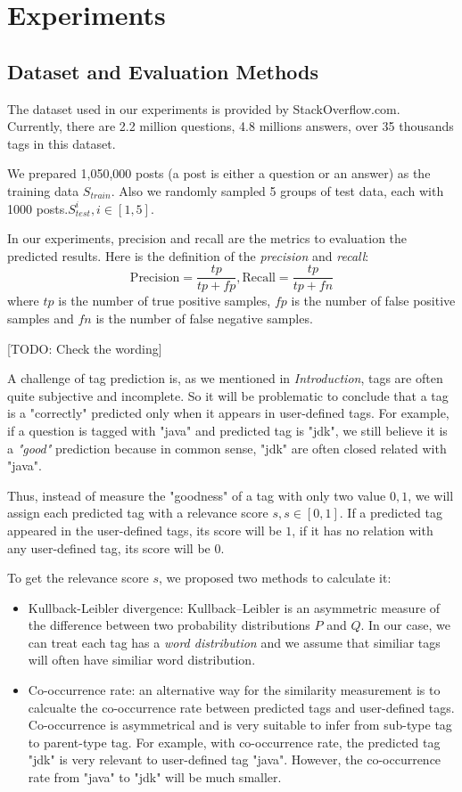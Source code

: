 \section{Experiments}

\subsection{Dataset and Evaluation Methods}
The dataset used in our experiments is provided by StackOverflow.com. Currently, there are 2.2 million questions, 4.8 millions answers, over 35 thousands tags in this dataset\cite{DataDump}.

We prepared 1,050,000 posts (a post is either a question or an answer)  as the training data $S_{train}$. Also we randomly sampled 5 groups of test data, each with 1000 posts.$S_{test}^i, i \in [1, 5]$.

In our experiments, precision and recall are the metrics to evaluation the predicted results. Here is the definition of the \emph{precision} and \emph{recall}:
$$ \text{Precision}=\frac{tp}{tp+fp}, \text{Recall}=\frac{tp}{tp+fn} $$
where $tp$ is the number of true positive samples, $fp$ is the number of false positive samples and $fn$ is the number of false negative samples.

[TODO: Check the wording]

A challenge of tag prediction is, as we mentioned in \emph{Introduction}, tags are often quite subjective and incomplete. So it will be problematic to conclude that a tag is a "correctly" predicted only when it appears in user-defined tags. For example, if a question is tagged with "java" and predicted tag is "jdk", we still believe it is a \emph{"good"} prediction because in common sense, "jdk" are often closed related with "java".

Thus, instead of measure the "goodness" of a tag with only two value ${0, 1}$, we will assign each predicted tag with a relevance score $s, s \in [0, 1]$. If a predicted tag appeared in the user-defined tags, its score will be $1$, if it has no relation with any user-defined tag, its score will be $0$.

To get the relevance score $s$, we proposed two methods to calculate it:
\begin{itemize}
    \item{Kullback-Leibler divergence}: Kullback–Leibler is an asymmetric measure of the difference between two probability distributions $P$ and $Q$. In our case, we can treat each tag has a \emph{word distribution} and we assume that similiar tags will often have similiar word distribution.
    \item{Co-occurrence rate}: an alternative way for the similarity measurement is to calcualte the co-occurrence rate between predicted tags and user-defined tags. Co-occurrence is asymmetrical and is very suitable to infer from sub-type tag to parent-type tag. For example, with co-occurrence rate, the predicted tag "jdk" is very relevant to user-defined tag "java". However, the co-occurrence rate from "java" to "jdk" will be much smaller.
\end{itemize}


